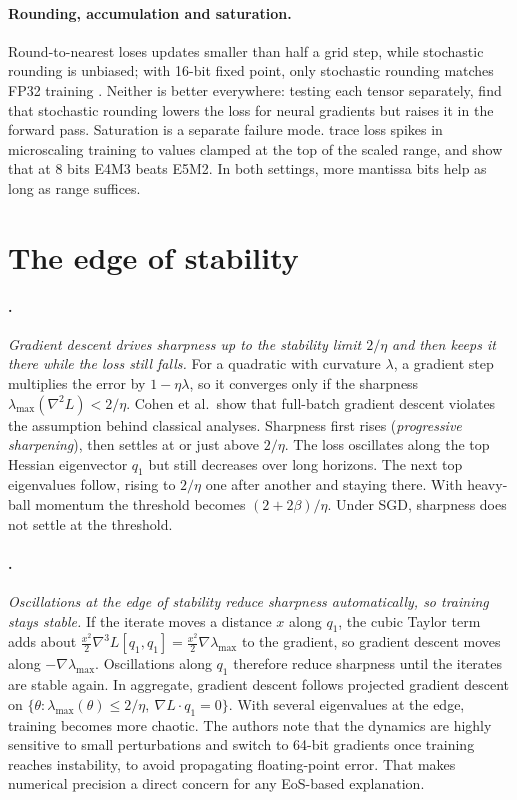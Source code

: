 \documentclass[11pt,letterpaper]{article}
\begin{document}
\paragraph{Rounding, accumulation and saturation.}
Round-to-nearest loses updates smaller than half a grid step, while stochastic rounding is unbiased; with 16-bit fixed point, only stochastic rounding matches FP32 training \citep{Gupta2015}. Neither is better everywhere: testing each tensor separately, \citet{Chmiel2025} find that stochastic rounding lowers the loss for neural gradients but raises it in the forward pass. Saturation is a separate failure mode. \citet{Su2025} trace loss spikes in microscaling training to values clamped at the top of the scaled range, and show that at 8 bits E4M3 beats E5M2. In both settings, more mantissa bits help as long as range suffices.

\section{The edge of stability}

\paragraph{\citet{Cohen2021}.}
\emph{Gradient descent drives sharpness up to the stability limit $2/\eta$ and then keeps it there while the loss still falls.} For a quadratic with curvature $\lambda$, a gradient step multiplies the error by $1-\eta\lambda$, so it converges only if the sharpness $\lambda_{\max}(\nabla^2L)<2/\eta$. Cohen et al.\ show that full-batch gradient descent violates the assumption behind classical analyses. Sharpness first rises (\emph{progressive sharpening}), then settles at or just above $2/\eta$. The loss oscillates along the top Hessian eigenvector $q_1$ but still decreases over long horizons. The next top eigenvalues follow, rising to $2/\eta$ one after another and staying there. With heavy-ball momentum the threshold becomes $(2+2\beta)/\eta$. Under SGD, sharpness does not settle at the threshold.

\paragraph{\citet{Damian2023}.}
\emph{Oscillations at the edge of stability reduce sharpness automatically, so training stays stable.} If the iterate moves a distance $x$ along $q_1$, the cubic Taylor term adds about $\tfrac{x^2}{2}\nabla^3L[q_1,q_1]=\tfrac{x^2}{2}\nabla\lambda_{\max}$ to the gradient, so gradient descent moves along $-\nabla\lambda_{\max}$. Oscillations along $q_1$ therefore reduce sharpness until the iterates are stable again. In aggregate, gradient descent follows projected gradient descent on $\{\theta:\lambda_{\max}(\theta)\le2/\eta,\ \nabla L\cdot q_1=0\}$. With several eigenvalues at the edge, training becomes more chaotic. The authors note that the dynamics are highly sensitive to small perturbations and switch to 64-bit gradients once training reaches instability, to avoid propagating floating-point error. That makes numerical precision a direct concern for any EoS-based explanation.
\end{document}
